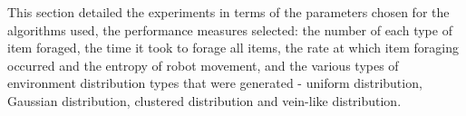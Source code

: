 This section detailed the experiments in terms of the parameters chosen for the algorithms used, the performance measures selected: the number of each type of item foraged, the time it took to forage all items, the rate at which item foraging occurred and the entropy of robot movement, and the various types of environment distribution types that were generated - uniform distribution, Gaussian distribution, clustered distribution and vein-like distribution. 


